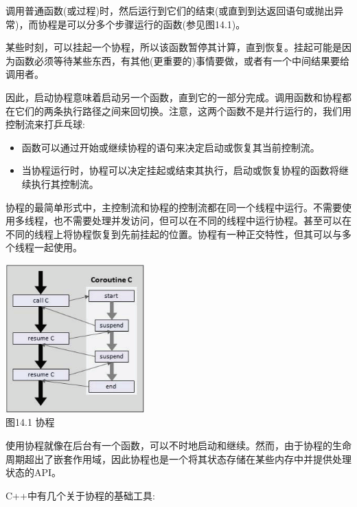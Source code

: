 调用普通函数(或过程)时，然后运行到它们的结束(或直到到达返回语句或抛出异常)，而协程是可以分多个步骤运行的函数(参见图14.1)。

某些时刻，可以挂起一个协程，所以该函数暂停其计算，直到恢复。挂起可能是因为函数必须等待某些东西，有其他(更重要的)事情要做，或者有一个中间结果要给调用者。

因此，启动协程意味着启动另一个函数，直到它的一部分完成。调用函数和协程都在它们的两条执行路径之间来回切换。注意，这两个函数不是并行运行的，我们用控制流来打乒乓球:

\begin{itemize}
\item
函数可以通过开始或继续协程的语句来决定启动或恢复其当前控制流。

\item
当协程运行时，协程可以决定挂起或结束其执行，启动或恢复协程的函数将继续执行其控制流。
\end{itemize}

协程的最简单形式中，主控制流和协程的控制流都在同一个线程中运行。不需要使用多线程，也不需要处理并发访问，但可以在不同的线程中运行协程。甚至可以在不同的线程上将协程恢复到先前挂起的位置。协程有一种正交特性，但其可以与多个线程一起使用。

\begin{center}
\includegraphics[width=0.4\textwidth]{content/chapter14/images/1.png}\\
图14.1 协程
\end{center}

使用协程就像在后台有一个函数，可以不时地启动和继续。然而，由于协程的生命周期超出了嵌套作用域，因此协程也是一个将其状态存储在某些内存中并提供处理状态的API。

C++中有几个关于协程的基础工具:

